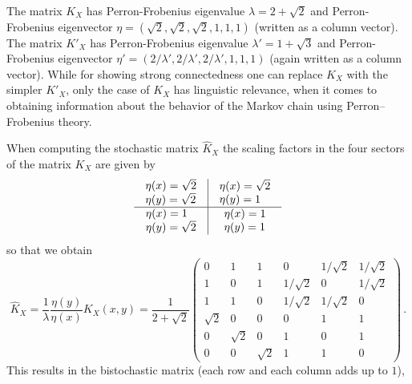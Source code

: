 \documentclass[12pt]{amsart}
\numberwithin{equation}{section}
\begin{document}
The matrix $K_X$ has 
Perron-Frobenius eigenvalue $\lambda=2+\sqrt{2}$ and 
Perron-Frobenius eigenvector $\eta=(\sqrt{2}, \sqrt{2},\sqrt{2}, 1,1,1)$ 
(written as a column vector).
The matrix $K'_X$ has 
Perron-Frobenius eigenvalue $\lambda'=1+\sqrt{3}$ and
Perron-Frobenius eigenvector 
$\eta'=(2/\lambda',2/\lambda',2/\lambda', 1,1,1)$ 
(again written as a column vector).
While for showing strong connectedness one can replace $K_X$ with the simpler $K'_X$, only the case of
$K_X$ has linguistic relevance, when it comes to obtaining information about the behavior of the
Markov chain using Perron--Frobenius theory. 

\smallskip

When computing the stochastic matrix $\hat K_X$ the
scaling factors in the four sectors of the matrix $K_X$ are given by
$$   \begin{array}{c | c}  \begin{array}{l}  \eta(x)=\sqrt{2} \\ \eta(y)=\sqrt{2} \end{array}
 &   \begin{array}{l}  \eta(x)=\sqrt{2} \\ \eta(y)=1 \end{array} \\ \hline  \begin{array}{l}  \eta(x)=1 \\ \eta(y)=\sqrt{2} \end{array} &   \begin{array}{l} \eta(x)=1 \\ \eta(y)=1 \end{array}
\end{array}  $$
so that we obtain
$$ \hat K_X =   \frac{1}{\lambda}   \frac{\eta(y)}{\eta(x)} K_X(x,y)= \frac{1}{2+\sqrt{2}} \begin{pmatrix}
0 & 1 & 1 & 0 & 1/\sqrt{2}   & 1/\sqrt{2}    \\
1 & 0 & 1 & 1/\sqrt{2}   & 0 & 1/\sqrt{2}    \\
1 & 1 & 0 & 1/\sqrt{2}   & 1/\sqrt{2}   & 0 \\
\sqrt{2}  & 0 & 0 & 0 & 1 & 1 \\
0 & \sqrt{2}  & 0 & 1 & 0 & 1 \\
0 & 0 & \sqrt{2}  & 1 & 1 & 0 
\end{pmatrix} \, . $$
This results in the bistochastic matrix (each row and each column adds up to $1$),
\end{document}
